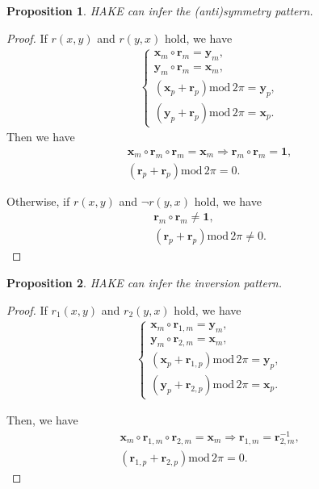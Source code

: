 \documentclass[letterpaper]{article} \usepackage{aaai20}  \usepackage{times}  \usepackage{helvet} \usepackage{courier}  \usepackage[hyphens]{url}  \usepackage{graphicx} \urlstyle{rm} \def\UrlFont{\rm}  \usepackage{graphicx}  \frenchspacing  \setlength{\pdfpagewidth}{8.5in}  \setlength{\pdfpageheight}{11in}
\newtheorem{prop}{Proposition}
\renewcommand{\mod}{\text{mod}\,}
\begin{document}
\begin{prop}
    HAKE can infer the (anti)symmetry pattern.
\end{prop}

\begin{proof}
    If $r(x, y)$ and $r(y, x)$ hold, we have
    \begin{align*}
        \begin{cases}
            \textbf{x}_m\circ \textbf{r}_m=\textbf{y}_m, \\ \textbf{y}_m\circ \textbf{r}_m=\textbf{x}_m, \\ (\textbf{x}_p+\textbf{r}_p) \mod 2\pi=\textbf{y}_p, \\ (\textbf{y}_p+\textbf{r}_p) \mod 2\pi=\textbf{x}_p.
        \end{cases}
    \end{align*}
    Then we have
    \begin{gather*}
        \textbf{x}_m \circ \textbf{r}_m \circ \textbf{r}_m =\textbf{x}_m \Rightarrow \textbf{r}_m \circ \textbf{r}_m = \textbf{1}, \\
        (\textbf{r}_p + \textbf{r}_p) \mod 2\pi = 0.
    \end{gather*}

    Otherwise, if $r(x, y)$ and $\neg r(y, x)$ hold, we have
    \begin{gather*}
        \textbf{r}_m \circ \textbf{r}_m \neq \textbf{1}, \\
        (\textbf{r}_p + \textbf{r}_p) \mod 2\pi \neq 0.
    \end{gather*}
\end{proof}

\begin{prop}
    HAKE can infer the inversion pattern.
\end{prop}

\begin{proof}
    If $r_1(x, y)$ and $r_2(y, x)$ hold, we have
    \begin{align*}
        \begin{cases}
        \textbf{x}_m\circ \textbf{r}_{1,m}=\textbf{y}_m, \\ \textbf{y}_m\circ \textbf{r}_{2,m}=\textbf{x}_m, \\ (\textbf{x}_p+\textbf{r}_{1,p}) \mod 2\pi=\textbf{y}_p, \\ (\textbf{y}_p+\textbf{r}_{2,p}) \mod 2\pi=\textbf{x}_p.
        \end{cases}
    \end{align*}
    
    Then, we have
    \begin{gather*}
    \textbf{x}_m \circ \textbf{r}_{1,m} \circ \textbf{r}_{2,m} =\textbf{x}_m \Rightarrow \textbf{r}_{1,m} = \textbf{r}_{2,m}^{-1}, \\
    (\textbf{r}_{1,p} + \textbf{r}_{2,p}) \mod 2\pi = 0.
    \end{gather*}
\end{proof}
\end{document}
